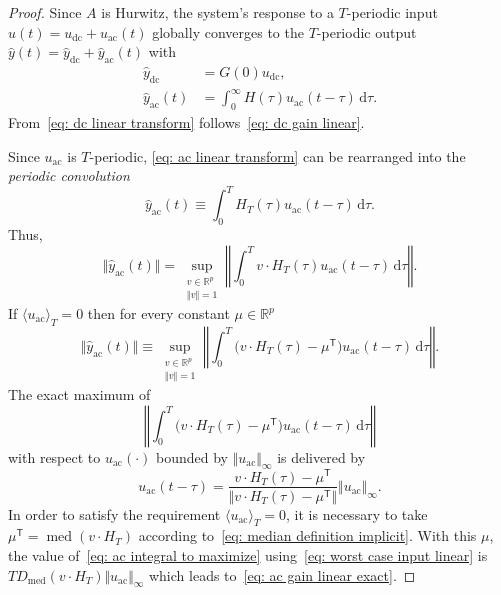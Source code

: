 \documentclass[letterpaper, 10 pt, conference]{ieeeconf}
\DeclareMathOperator{\median}{med}
\newcommand{\ac}{_\mathrm{ac}}
\newcommand{\dc}{_\mathrm{dc}}
\newcommand{\trans}{^\mathsf{T}}
\newcommand{\dif}{\mathrm{d}}
\newcommand{\pb}[1]{\big( #1 \big)}
\newcommand{\norm}[1]{\Vert #1 \Vert}
\newcommand{\normx}[1]{\left\Vert #1 \right\Vert}
\newcommand{\mean}[1]{\langle #1 \rangle}
\newcommand{\bbR}{\mathbb{R}}
\begin{document}
\begin{proof}
    Since $A$ is Hurwitz, the system's response to a $T$-periodic input $u(t) = u\dc + u\ac(t)$ globally converges to the $T$-periodic output $\hat y(t) = \hat y\dc + \hat y\ac(t)$ with
    \begin{subequations}
        \begin{align}
            \label{eq: dc linear transform}
            \hat y\dc &= G(0) u\dc,\\
            \label{eq: ac linear transform}
            \hat y\ac(t) &= \int_0^\infty H(\tau) u\ac(t-\tau) \,\dif\tau.
        \end{align}
    \end{subequations}
    From~\eqref{eq: dc linear transform} follows~\eqref{eq: dc gain linear}.
    
    Since $u\ac$ is $T$-periodic, \eqref{eq: ac linear transform} can be rearranged into the \emph{periodic convolution}
    \begin{equation}
        \label{eq: ac linear transform periodic}
        \hat y\ac(t) \equiv \int_0^T H_T(\tau) u\ac(t-\tau) \,\dif\tau.
    \end{equation}
    Thus,
    \begin{equation}
        \label{eq: output norm as supremum}
        \norm{\hat y\ac(t)} = \sup_{\substack{v\in\bbR^p \\ \norm{v} = 1}}
        \normx{\int_0^T v \cdot H_T(\tau) u\ac(t-\tau) \,\dif\tau}.
    \end{equation}
    If $\mean{u\ac}_T = 0$ then for every constant $\mu \in \bbR^p$
    \begin{equation}
        \norm{\hat y\ac(t)} \equiv \sup_{\substack{v\in\bbR^p \\ \norm{v} = 1}}
        \normx{\int_0^T \pb{v \cdot H_T(\tau) - \mu\trans} u\ac(t-\tau) \,\dif\tau}.
    \end{equation}
    The exact maximum of
    \begin{equation}
        \label{eq: ac integral to maximize}
        \normx{\int_0^T \pb{v \cdot H_T(\tau) - \mu\trans} u\ac(t-\tau) \,\dif\tau}
    \end{equation}
    with respect to $u\ac(\cdot)$ bounded by $\norm{u\ac}_\infty$ is delivered by
    \begin{equation}
        \label{eq: worst case input linear}
        u\ac(t-\tau) = \frac{v \cdot H_T(\tau) - \mu\trans}
        {\norm{v \cdot H_T(\tau) - \mu\trans}} \norm{u\ac}_\infty.
    \end{equation}
    In order to satisfy the requirement $\mean{u\ac}_T = 0$, it is necessary to take $\mu\trans = \median(v \cdot H_T)$ according to~\eqref{eq: median definition implicit}. With this $\mu$, the value of~\eqref{eq: ac integral to maximize} using~\eqref{eq: worst case input linear} is $T D_{\median}(v \cdot H_T) \norm{u\ac}_\infty$ which leads to~\eqref{eq: ac gain linear exact}.
\end{proof}
\end{document}
